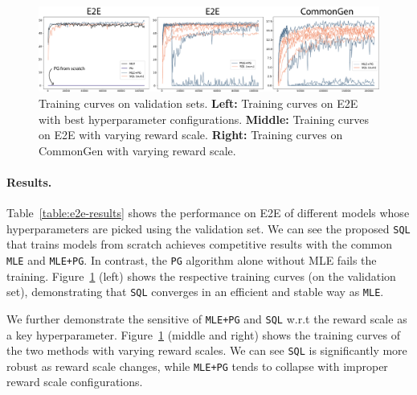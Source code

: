 \begin{figure}
    \centering
    \includegraphics[width=0.99\linewidth]{figures/20210530.standard-tasks-small.pdf}
    \caption{Training curves on validation sets. {\bf Left:} Training curves on E2E with best hyperparameter configurations. {\bf Middle:} Training curves on E2E with varying reward scale. {\bf Right:} Training curves on CommonGen with varying reward scale.
    }
    \label{fig:supervised-text-generation-tasks}
\end{figure}

\paragraph{Results.}
Table~\ref{table:e2e-results} shows the performance on E2E of different models whose hyperparameters are picked using the validation set. We can see the proposed \texttt{SQL} that trains models from scratch achieves competitive results with the common \texttt{MLE} and \texttt{MLE+PG}. In contrast, the \texttt{PG} algorithm alone without MLE fails the training. Figure~\ref{fig:supervised-text-generation-tasks} (left) shows the respective training curves (on the validation set), demonstrating that \texttt{SQL} converges in an efficient and stable way as \texttt{MLE}.

We further demonstrate the sensitive of \texttt{MLE+PG} and \texttt{SQL} w.r.t the reward scale as a key hyperparameter. Figure~\ref{fig:supervised-text-generation-tasks} (middle and right) shows the training curves of the two methods with varying reward scales. We can see \texttt{SQL} is significantly more robust as reward scale changes, while \texttt{MLE+PG} tends to collapse with improper reward scale configurations. 


